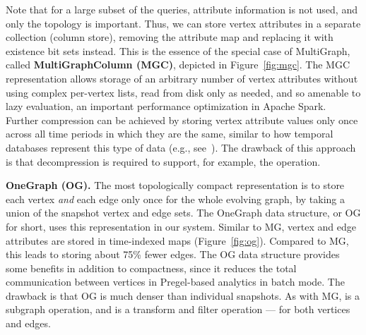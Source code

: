 Note that for a large subset of the queries, attribute information is
not used, and only the topology is important.  Thus, we can store
vertex attributes in a separate collection (column store), removing
the attribute map and replacing it with existence bit sets instead.
This is the essence of the special case of MultiGraph, called {\bf
  MultiGraphColumn (MGC)}, depicted in Figure~\ref{fig:mgc}.  The MGC
representation allows storage of an arbitrary number of vertex
attributes without using complex per-vertex lists, read from disk only
as needed, and so amenable to lazy evaluation, an important
performance optimization in Apache Spark.  Further compression can be
achieved by storing vertex attribute values only once across all time
periods in which they are the same, similar to how temporal databases
represent this type of data (e.g., see~\cite{Muller2008}).  The
drawback of this approach is that decompression is required to
support, for example, the  operation.


{\bf OneGraph (OG).}  The most topologically compact representation is
to store each vertex {\em and} each edge only once for the whole
evolving graph, by taking a union of the snapshot vertex and edge
sets.  The OneGraph data structure, or OG for short, uses this
representation in our system.  Similar to MG, vertex and edge
attributes are stored in time-indexed maps (Figure~\ref{fig:og}).
Compared to MG, this leads to storing about 75\% fewer edges.  The OG
data structure provides some benefits in addition to compactness,
since it reduces the total communication between vertices in
Pregel-based analytics in batch mode.  The drawback is that OG is much
denser than individual snapshots.  As with MG,  is a
subgraph operation, and  is a transform and filter
operation --- for both vertices and edges.

